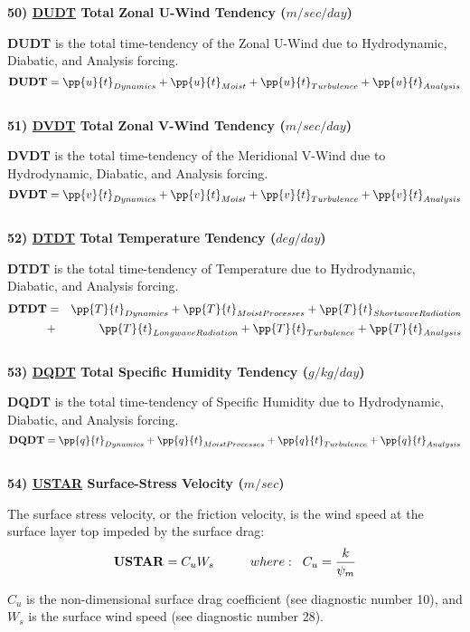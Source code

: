 \noindent
{\bf 50)  \underline {DUDT} Total Zonal U-Wind Tendency  ($m/sec/day$) }

\noindent
{\bf DUDT} is the total time-tendency of the Zonal U-Wind due to Hydrodynamic, Diabatic,
and Analysis forcing.
\[
{\bf DUDT} = \pp{u}{t}_{Dynamics} + \pp{u}{t}_{Moist} + \pp{u}{t}_{Turbulence} + \pp{u}{t}_{Analysis} 
\]
\\

\noindent
{\bf 51)  \underline {DVDT} Total Zonal V-Wind Tendency  ($m/sec/day$) }

\noindent
{\bf DVDT} is the total time-tendency of the Meridional V-Wind due to Hydrodynamic, Diabatic,
and Analysis forcing.
\[
{\bf DVDT} = \pp{v}{t}_{Dynamics} + \pp{v}{t}_{Moist} + \pp{v}{t}_{Turbulence} + \pp{v}{t}_{Analysis} 
\]
\\

\noindent
{\bf 52)  \underline {DTDT} Total Temperature Tendency  ($deg/day$) }

\noindent
{\bf DTDT} is the total time-tendency of Temperature due to Hydrodynamic, Diabatic,
and Analysis forcing.
\begin{eqnarray*}
{\bf DTDT} & = & \pp{T}{t}_{Dynamics} + \pp{T}{t}_{Moist Processes} + \pp{T}{t}_{Shortwave Radiation} \\
           & + & \pp{T}{t}_{Longwave Radiation} + \pp{T}{t}_{Turbulence} + \pp{T}{t}_{Analysis} 
\end{eqnarray*}
\\

\noindent
{\bf 53)  \underline {DQDT} Total Specific Humidity Tendency  ($g/kg/day$) }

\noindent
{\bf DQDT} is the total time-tendency of Specific Humidity due to Hydrodynamic, Diabatic,
and Analysis forcing.
\[
{\bf DQDT} = \pp{q}{t}_{Dynamics} + \pp{q}{t}_{Moist Processes} 
+ \pp{q}{t}_{Turbulence} + \pp{q}{t}_{Analysis} 
\]
\\
   
\noindent
{\bf 54)  \underline {USTAR}  Surface-Stress Velocity ($m/sec$) }

\noindent
The surface stress velocity, or the friction velocity, is the wind speed at 
the surface layer top impeded by the surface drag:
\[
{\bf USTAR} = C_uW_s \hspace{1cm}where: \hspace{.2cm} 
C_u = {k \over {\psi_m} }
\]

\noindent
$C_u$ is the non-dimensional surface drag coefficient (see diagnostic
number 10), and $W_s$ is the surface wind speed (see diagnostic number 28).
 
